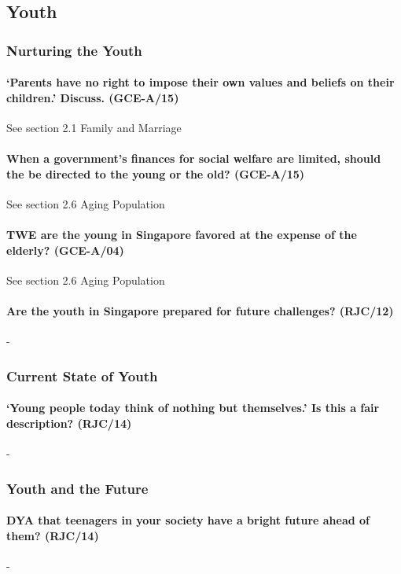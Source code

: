 \documentclass[../../main]{subfiles}
\begin{document}
\subsection{Youth}

\subsubsection{Nurturing the Youth}

\paragraph{`Parents have no right to impose their own values and beliefs on their children.' Discuss. (GCE-A/15)} See section 2.1 Family and Marriage

\paragraph{When a government's finances for social welfare are limited, should the be directed to the young or the old? (GCE-A/15)} See section 2.6 Aging Population

\paragraph{TWE are the young in Singapore favored at the expense of the elderly? (GCE-A/04)} See section 2.6 Aging Population

\paragraph{Are the youth in Singapore prepared for future challenges? (RJC/12)}-

\subsubsection{Current State of Youth}

\paragraph{`Young people today think of nothing but themselves.' Is this a fair description? (RJC/14)}-

\subsubsection{Youth and the Future}

\paragraph{DYA that teenagers in your society have a bright future ahead of them? (RJC/14)}-
\end{document}
